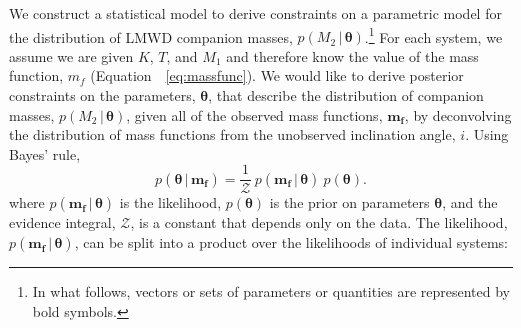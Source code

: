 \documentclass[apjl]{emulateapj}
\newcommand{\given}{\,|\,}
\newcommand{\bs}[1]{\boldsymbol{#1}}
\newcommand{\eqn}{Equation~}
\newcommand{\mf}{m_f}
\begin{document}
We construct a statistical model to derive constraints on a parametric model for the distribution of LMWD companion masses, $p(M_2 \given \bs{\theta})$.\footnote{In what follows, vectors or sets of parameters or quantities are represented by bold symbols.} For each system, we assume we are given $K$, $T$, and $M_1$ and therefore know the value of the mass function, $\mf$ (\eqn~\ref{eq:massfunc}). We would like to derive posterior constraints on the parameters, $\bs{\theta}$, that describe the distribution of companion masses, $p(M_2\given \bs{\theta})$, given all of the observed mass functions, $\bs{m_f}$, by deconvolving the distribution of mass functions from the unobserved inclination angle, $i$. Using Bayes' rule,
\begin{equation}
    p(\bs{\theta} \given \bs{\mf}) = \frac{1}{\mathcal{Z}}~p(\bs{\mf} \given \bs{\theta})~p(\bs{\theta}).
\end{equation}
where $p(\bs{\mf} \given \bs{\theta})$ is the likelihood, $p(\bs{\theta})$ is the prior on parameters $\bs{\theta}$, and the evidence integral, $\mathcal{Z}$, is a constant that depends only on the data. The likelihood, $p(\bs{\mf} \given \bs{\theta})$, can be split into a product over the likelihoods of individual systems:
\end{document}
